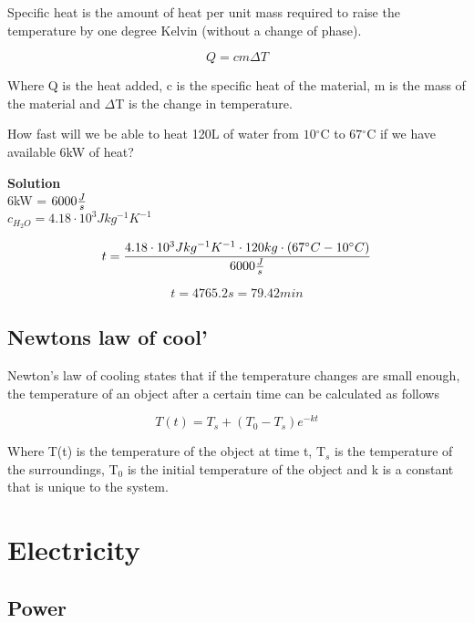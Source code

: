 \documentclass[11pt,fleqn,openany]{book} %
\newcommand{\degree}{\ensuremath{^\circ}}
\begin{document}
Specific heat is the amount of heat per unit mass required to raise the temperature by one degree Kelvin (without a change of phase).

\begin{equation}
Q = c m \Delta T
\end{equation}

Where Q is the heat added, c is the specific heat of the material, m is the mass of the material and $\Delta$T is the change in temperature.

\begin{exercise}
How fast will we be able to heat 120L of water from $10\degree$C to $67\degree$C if we have available 6kW of heat?

\textbf{Solution}\\
6kW = $6000 {J \over s}$\\
$c_{H_2 O} = 4.18 \cdot 10^3 J kg^{-1} K^{-1} $

\begin{equation*}
t = {{4.18 \cdot 10^3 J kg^{-1} K^{-1} \cdot 120kg \cdot (67\degree C -10\degree C) } \over {6000 {J \over s}}}
\end{equation*}

\begin{equation*}
t = 4765.2 s = 79.42 min
\end{equation*}

\end{exercise}

\subsection{Newtons law of cool'}

Newton's law of cooling states that if the temperature changes are small enough, the temperature of an object after a certain time can be calculated as follows

\begin{equation}
T(t) = T_s + (T_0 - T_s) e^{-kt}
\end{equation}

Where T(t) is the temperature of the object at time t, T$_s$ is the temperature of the surroundings, T$_0$ is the initial temperature of the object and k is a constant that is unique to the system.

\section{Electricity}

\subsection{Power}
\end{document}
